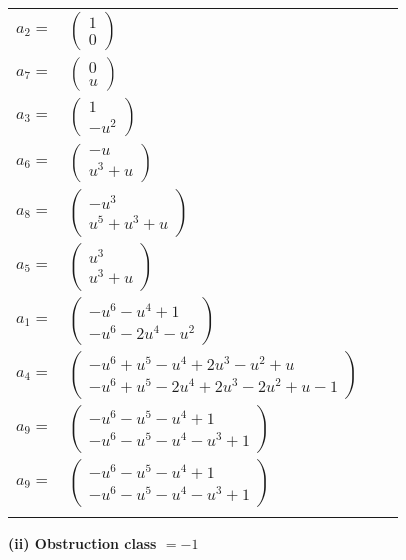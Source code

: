 \documentclass[1p]{elsarticle_modified}
\theoremstyle{definition}
\begin{document}
\begin{tabular}{m{7pt} m{180pt} m{7pt} m{180pt} }
\flushright $a_{2}=$&$\begin{pmatrix}1\\0\end{pmatrix}$ \\
\flushright $a_{7}=$&$\begin{pmatrix}0\\u\end{pmatrix}$ \\
\flushright $a_{3}=$&$\begin{pmatrix}1\\- u^2\end{pmatrix}$ \\
\flushright $a_{6}=$&$\begin{pmatrix}- u\\u^3+u\end{pmatrix}$ \\
\flushright $a_{8}=$&$\begin{pmatrix}- u^3\\u^5+u^3+u\end{pmatrix}$ \\
\flushright $a_{5}=$&$\begin{pmatrix}u^3\\u^3+u\end{pmatrix}$ \\
\flushright $a_{1}=$&$\begin{pmatrix}- u^6- u^4+1\\- u^6-2 u^4- u^2\end{pmatrix}$ \\
\flushright $a_{4}=$&$\begin{pmatrix}- u^6+u^5- u^4+2 u^3- u^2+u\\- u^6+u^5-2 u^4+2 u^3-2 u^2+u-1\end{pmatrix}$ \\
\flushright $a_{9}=$&$\begin{pmatrix}- u^6- u^5- u^4+1\\- u^6- u^5- u^4- u^3+1\end{pmatrix}$\\ \flushright $a_{9}=$&$\begin{pmatrix}- u^6- u^5- u^4+1\\- u^6- u^5- u^4- u^3+1\end{pmatrix}$\\&\end{tabular}
\flushleft \textbf{(ii) Obstruction class $= -1$}\\~\\
\end{document}
